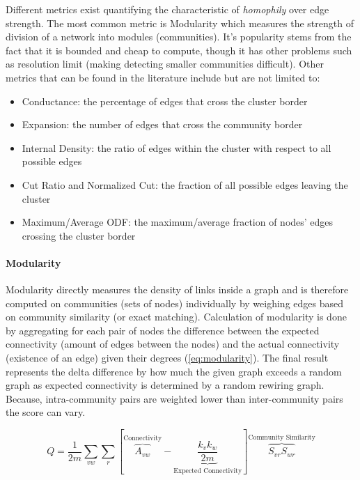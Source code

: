\documentclass[
acmsmall,
nonacm,
screen,
acmthm]{../../scripts/pandoc/templates/acmart}
\providecommand{\tightlist}{%
\setlength{\itemsep}{0pt}\setlength{\parskip}{0pt}}
\begin{document}
Different metrics exist quantifying the characteristic of
\emph{homophily} over edge strength. The most common metric is
Modularity which measures the strength of division of a network into
modules (communities). It's popularity stems from the fact that it is
bounded and cheap to compute, though it has other problems such as
resolution limit (making detecting smaller communities difficult). Other
metrics that can be found in the literature include but are not limited
to:

\begin{itemize}
\tightlist
\item
  Conductance: the percentage of edges that cross the cluster border
\item
  Expansion: the number of edges that cross the community border
\item
  Internal Density: the ratio of edges within the cluster with respect
  to all possible edges
\item
  Cut Ratio and Normalized Cut: the fraction of all possible edges
  leaving the cluster
\item
  Maximum/Average ODF: the maximum/average fraction of nodes' edges
  crossing the cluster border
\end{itemize}

\hypertarget{modularity}{%
\paragraph{Modularity}\label{modularity}}

Modularity directly measures the density of links inside a graph and is
therefore computed on communities (sets of nodes) individually by
weighing edges based on community similarity (or exact matching).
Calculation of modularity is done by aggregating for each pair of nodes
the difference between the expected connectivity (amount of edges
between the nodes) and the actual connectivity (existence of an edge)
given their degrees (\cref{eq:modularity}). The final result represents
the delta difference by how much the given graph exceeds a random graph
as expected connectivity is determined by a random rewiring graph.
Because, intra-community pairs are weighted lower than inter-community
pairs the score can vary.

\[
Q=\frac{1}{2 m}\sum_{v w}\sum_{r}\left[\overbrace{A_{v w}}^{\text{Connectivity}}-\underbrace{\frac{k_{v} k_{w}}{2 m}}_{\text{Expected Connectivity}}\right] \overbrace{S_{v r} S_{w r}}^{\text{Community Similarity}}
\]
\end{document}
